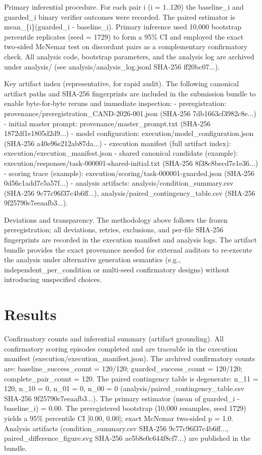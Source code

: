 \documentclass[conference]{IEEEtran}
\begin{document}
Primary inferential procedure. For each pair i (i = 1..120) the baseline\_i and guarded\_i binary verifier outcomes were recorded. The paired estimator is mean\_\{i\}(guarded\_i - baseline\_i). Primary inference used 10,000 bootstrap percentile replicates (seed = 1729) to form a 95\% CI and employed the exact two‑sided McNemar test on discordant pairs as a complementary confirmatory check. All analysis code, bootstrap parameters, and the analysis log are archived under analysis/ (see analysis/analysis\_log.jsonl SHA‑256 ff20bc07...).

Key artifact index (representative, for rapid audit). The following canonical artifact paths and SHA‑256 fingerprints are included in the submission bundle to enable byte‑for‑byte reruns and immediate inspection:
- preregistration: provenance/preregistration\_CAND-2026-001.json (SHA‑256 7db1663cf3982c8e...)
- initial master prompt: provenance/master\_prompt.txt (SHA‑256 1872df1e1805d2d9...)
- model configuration: execution/model\_configuration.json (SHA‑256 a40e96e212ab87da...)
- execution manifest (full artifact index): execution/execution\_manifest.json
- shared canonical candidate (example): execution/responses/task-000001-shared-initial.txt (SHA‑256 8f38c8becd7e1e36...)
- scoring trace (example): execution/scoring/task-000001-guarded.json (SHA‑256 0d56c1add7c5a57f...)
- analysis artifacts: analysis/condition\_summary.csv (SHA‑256 9c77c96f37c4b6ff...), analysis/paired\_contingency\_table.csv (SHA‑256 9f25790c7eeaafb3...).

Deviations and transparency. The methodology above follows the frozen preregistration; all deviations, retries, exclusions, and per‑file SHA‑256 fingerprints are recorded in the execution manifest and analysis logs. The artifact bundle provides the exact provenance needed for external auditors to re‑execute the analysis under alternative generation semantics (e.g., independent\_per\_condition or multi‑seed confirmatory designs) without introducing unspecified choices.

\section{Results}
Confirmatory counts and inferential summary (artifact grounding). All confirmatory scoring episodes completed and are traceable in the execution manifest (execution/execution\_manifest.json). The archived confirmatory counts are: baseline\_success\_count = 120/120; guarded\_success\_count = 120/120; complete\_pair\_count = 120. The paired contingency table is degenerate: n\_11 = 120, n\_10 = 0, n\_01 = 0, n\_00 = 0 (analysis/paired\_contingency\_table.csv SHA‑256 9f25790c7eeaafb3...). The primary estimator (mean of guarded\_i - baseline\_i) = 0.00. The preregistered bootstrap (10,000 resamples, seed 1729) yields a 95\% percentile CI [0.00, 0.00]; exact McNemar two‑sided p = 1.0. Analysis artifacts (condition\_summary.csv SHA‑256 9c77c96f37c4b6ff..., paired\_difference\_figure.svg SHA‑256 ae5b8e0c644f8cf7...) are published in the bundle.
\end{document}
